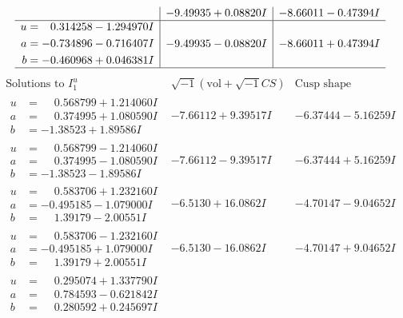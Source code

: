 \documentclass[1p]{elsarticle_modified}
\theoremstyle{definition}
\newcommand{\I}{\sqrt{-1}}
\begin{document}
$$\begin{array}{c|c|c}
 & -9.49935 + 0.08820 I & -8.66011 - 0.47394 I \\ \hline\begin{aligned}
u &= \phantom{-}0.314258 - 1.294970 I \\
a &= -0.734896 - 0.716407 I \\
b &= -0.460968 + 0.046381 I\end{aligned}
 & -9.49935 - 0.08820 I & -8.66011 + 0.47394 I\\
 \hline 
 \end{array}$$\newpage$$\begin{array}{c|c|c}  
\text{Solutions to }I^u_{1}& \I (\text{vol} + \sqrt{-1}CS) & \text{Cusp shape}\\
 \hline 
\begin{aligned}
u &= \phantom{-}0.568799 + 1.214060 I \\
a &= \phantom{-}0.374995 + 1.080590 I \\
b &= -1.38523 + 1.89586 I\end{aligned}
 & -7.66112 + 9.39517 I & -6.37444 - 5.16259 I \\ \hline\begin{aligned}
u &= \phantom{-}0.568799 - 1.214060 I \\
a &= \phantom{-}0.374995 - 1.080590 I \\
b &= -1.38523 - 1.89586 I\end{aligned}
 & -7.66112 - 9.39517 I & -6.37444 + 5.16259 I \\ \hline\begin{aligned}
u &= \phantom{-}0.583706 + 1.232160 I \\
a &= -0.495185 - 1.079000 I \\
b &= \phantom{-}1.39179 - 2.00551 I\end{aligned}
 & -6.5130 + 16.0862 I & -4.70147 - 9.04652 I \\ \hline\begin{aligned}
u &= \phantom{-}0.583706 - 1.232160 I \\
a &= -0.495185 + 1.079000 I \\
b &= \phantom{-}1.39179 + 2.00551 I\end{aligned}
 & -6.5130 - 16.0862 I & -4.70147 + 9.04652 I \\ \hline\begin{aligned}
u &= \phantom{-}0.295074 + 1.337790 I \\
a &= \phantom{-}0.784593 - 0.621842 I \\
b &= \phantom{-}0.280592 + 0.245697 I\end{aligned}

\end{array}$$
\end{document}
